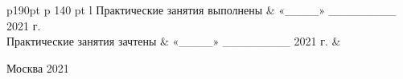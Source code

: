 \begin{titlepage}
\vspace{1 cm}

\begin{tabular}{ p{190pt} p {140 pt} l}
	\small{Практические занятия выполнены} & \small{«{\_\_\_\_}» \_\_\_\_\_\_\_\_ 2021 г.}  \\ [0,9 cm]
	\small{Практические занятия зачтены} & \small{«{\_\_\_\_}» \_\_\_\_\_\_\_\_ 2021 г.} & \\ [0,9 cm]

\end{tabular}

\begin{center}
\vspace*{\fill}
	\small{Москва}
	\small{2021}
\end{center}

\end{titlepage}
